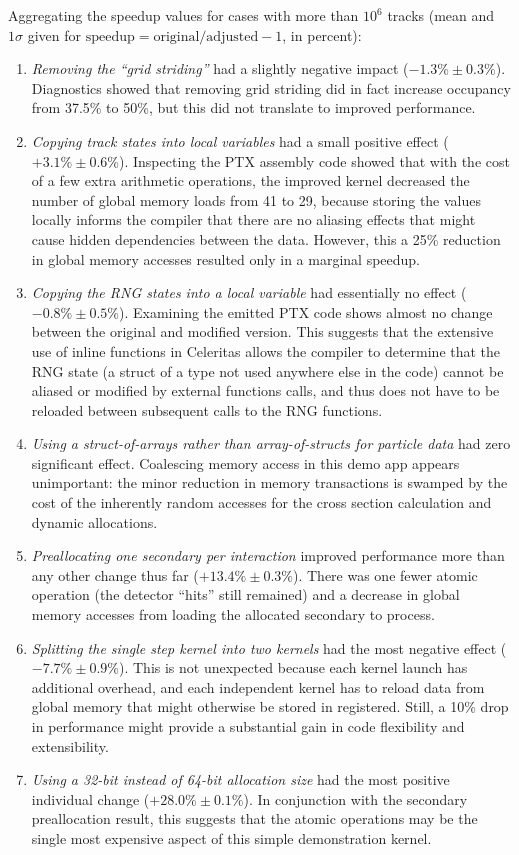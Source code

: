 \documentclass{webofc}
\begin{document}
Aggregating the speedup values for cases with more than $10^6$ tracks (mean and
$1\sigma$ given for $\mbox{speedup}=\mbox{original}/\mbox{adjusted} - 1$, in
percent):
\begin{enumerate}[left=0pt, itemsep=0pt]
  \item \emph{Removing the ``grid striding''} had a slightly negative impact
    ($-1.3\% \pm 0.3\%$). Diagnostics showed
    that removing grid striding did in fact increase occupancy from 37.5\% to
    50\%, but this did not translate to improved performance.
  \item \emph{Copying track states into local variables} had a small positive
    effect ($+3.1\% \pm 0.6\%$). Inspecting the PTX assembly code showed that
    with the cost of a few extra arithmetic operations, the improved kernel
    decreased the number of global memory loads from 41 to 29, because storing
    the values locally informs the compiler that there are no aliasing effects
    that might cause hidden dependencies between the data. However, this a 25\%
    reduction in global memory accesses resulted only in a marginal speedup.
  \item \emph{Copying the RNG states into a local variable} had essentially no effect
    ($-0.8\% \pm 0.5\%$). Examining the emitted PTX code shows almost no change
    between the original and modified version. This suggests that the extensive
    use of inline functions in Celeritas allows the compiler to determine that
    the RNG state (a struct of a type not used anywhere else in the code) cannot
    be aliased or modified by external functions calls, and thus does not have
    to be reloaded between subsequent calls to the RNG functions.
  \item \emph{Using a struct-of-arrays rather than array-of-structs for particle
    data} had zero significant effect. Coalescing memory access in this demo app
    appears unimportant: the minor reduction in memory transactions is swamped
    by the cost of the inherently random accesses for the cross section
    calculation and dynamic allocations.
  \item \emph{Preallocating one secondary per interaction} improved performance
    more than any other change thus far ($+13.4\% \pm 0.3\%$). There was one
    fewer atomic operation (the detector ``hits'' still remained) and a decrease
    in global
    memory accesses from loading the allocated secondary to process.
  \item \emph{Splitting the single step kernel into two kernels} had the most
    negative effect ($-7.7\% \pm 0.9\%$). This is not unexpected because each
    kernel launch has additional overhead, and each independent kernel has to
    reload data from global memory that might otherwise be stored in registered.
    Still, a 10\% drop in performance might provide a substantial gain in code
    flexibility and extensibility.
  \item \emph{Using a 32-bit instead of 64-bit allocation size} had the most
    positive individual change ($+28.0\% \pm 0.1\%$). In conjunction with the
    secondary preallocation result, this suggests that the atomic operations may
    be the single most expensive aspect of this simple demonstration kernel.
\end{enumerate}
\end{document}

